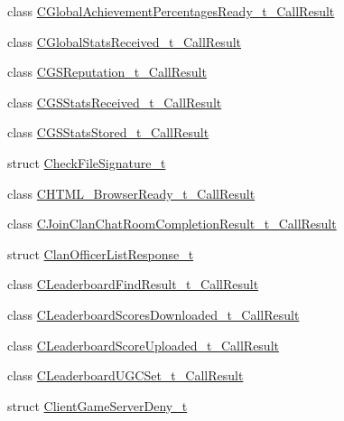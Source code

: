 \begin{DoxyCompactItemize}
class \hyperlink{class_valve_1_1_steamworks_1_1_c_global_achievement_percentages_ready__t___call_result}{C\+Global\+Achievement\+Percentages\+Ready\+\_\+t\+\_\+\+Call\+Result}
\item 
class \hyperlink{class_valve_1_1_steamworks_1_1_c_global_stats_received__t___call_result}{C\+Global\+Stats\+Received\+\_\+t\+\_\+\+Call\+Result}
\item 
class \hyperlink{class_valve_1_1_steamworks_1_1_c_g_s_reputation__t___call_result}{C\+G\+S\+Reputation\+\_\+t\+\_\+\+Call\+Result}
\item 
class \hyperlink{class_valve_1_1_steamworks_1_1_c_g_s_stats_received__t___call_result}{C\+G\+S\+Stats\+Received\+\_\+t\+\_\+\+Call\+Result}
\item 
class \hyperlink{class_valve_1_1_steamworks_1_1_c_g_s_stats_stored__t___call_result}{C\+G\+S\+Stats\+Stored\+\_\+t\+\_\+\+Call\+Result}
\item 
struct \hyperlink{struct_valve_1_1_steamworks_1_1_check_file_signature__t}{Check\+File\+Signature\+\_\+t}
\item 
class \hyperlink{class_valve_1_1_steamworks_1_1_c_h_t_m_l___browser_ready__t___call_result}{C\+H\+T\+M\+L\+\_\+\+Browser\+Ready\+\_\+t\+\_\+\+Call\+Result}
\item 
class \hyperlink{class_valve_1_1_steamworks_1_1_c_join_clan_chat_room_completion_result__t___call_result}{C\+Join\+Clan\+Chat\+Room\+Completion\+Result\+\_\+t\+\_\+\+Call\+Result}
\item 
struct \hyperlink{struct_valve_1_1_steamworks_1_1_clan_officer_list_response__t}{Clan\+Officer\+List\+Response\+\_\+t}
\item 
class \hyperlink{class_valve_1_1_steamworks_1_1_c_leaderboard_find_result__t___call_result}{C\+Leaderboard\+Find\+Result\+\_\+t\+\_\+\+Call\+Result}
\item 
class \hyperlink{class_valve_1_1_steamworks_1_1_c_leaderboard_scores_downloaded__t___call_result}{C\+Leaderboard\+Scores\+Downloaded\+\_\+t\+\_\+\+Call\+Result}
\item 
class \hyperlink{class_valve_1_1_steamworks_1_1_c_leaderboard_score_uploaded__t___call_result}{C\+Leaderboard\+Score\+Uploaded\+\_\+t\+\_\+\+Call\+Result}
\item 
class \hyperlink{class_valve_1_1_steamworks_1_1_c_leaderboard_u_g_c_set__t___call_result}{C\+Leaderboard\+U\+G\+C\+Set\+\_\+t\+\_\+\+Call\+Result}
\item 
struct \hyperlink{struct_valve_1_1_steamworks_1_1_client_game_server_deny__t}{Client\+Game\+Server\+Deny\+\_\+t}

\end{DoxyCompactItemize}
